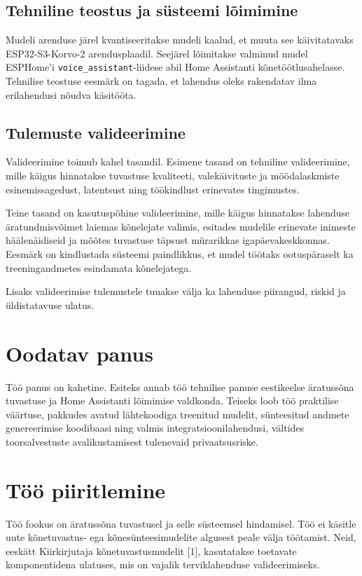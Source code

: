 \documentclass[12pt]{report}
\begin{document}
\section{Tehniline teostus ja süsteemi lõimimine}
Mudeli arenduse järel kvantiseeritakse mudeli kaalud, et muuta see käivitatavaks ESP32-S3-Korvo-2 arendusplaadil. Seejärel lõimitakse valminud mudel ESPHome'i \texttt{voice\_assistant}-liidese abil Home Assistanti kõnetöötlusahelasse. Tehnilise teostuse eesmärk on tagada, et lahendus oleks rakendatav ilma erilahendusi nõudva käsitööta.

\section{Tulemuste valideerimine}
Valideerimine toimub kahel tasandil. Esimene tasand on tehniline valideerimine, mille käigus hinnatakse tuvastuse kvaliteeti, valekäivituste ja möödalaskmiste esinemissagedust, latentsust ning töökindlust erinevates tingimustes.

Teine tasand on kasutuspõhine valideerimine, mille käigus hinnatakse lahenduse äratundmisvõimet laiemas kõnelejate valimis, esitades mudelile erinevate inimeste häälenäidiseid ja mõõtes tuvastuse täpsust mürarikkas igapäevakeskkonnas. Eesmärk on kindlustada süsteemi paindlikkus, et mudel töötaks ootuspäraselt ka treeningandmetes esindamata kõnelejatega.

Lisaks valideerimise tulemustele tuuakse välja ka lahenduse piirangud, riskid ja üldistatavuse ulatus.

\chapter{Oodatav panus}
Töö panus on kahetine. Esiteks annab töö tehnilise panuse eestikeelse äratussõna tuvastuse ja Home Assistanti lõimimise valdkonda. Teiseks loob töö praktilise väärtuse, pakkudes avatud lähtekoodiga treenitud mudelit, sünteesitud andmete genereerimise koodibaasi ning valmis integratsioonilahendusi, vältides toorsalvestuste avalikustamisest tulenevaid privaatsusriske.

\chapter{Töö piiritlemine}
Töö fookus on äratussõna tuvastusel ja selle süsteemsel hindamisel. Töö ei käsitle uute kõnetuvastus- ega kõnesünteesimudelite algusest peale välja töötamist. Neid, eeskätt Kiirkirjutaja kõnetuvastusmudelit [1], kasutatakse toetavate komponentidena ulatuses, mis on vajalik terviklahenduse valideerimiseks.
\end{document}
